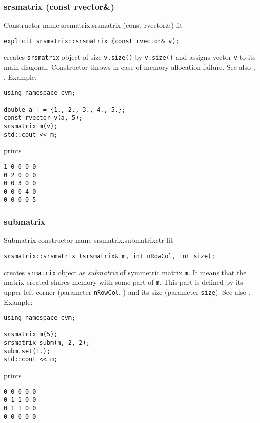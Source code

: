 \subsubsection{srsmatrix (const rvector\&)}
Constructor%
\pdfdest name {srsmatrix.srsmatrix (const rvector&)} fit
\begin{verbatim}
explicit srsmatrix::srsmatrix (const rvector& v);
\end{verbatim}
creates  \verb"srsmatrix" object
of size \verb"v.size()" by \verb"v.size()"
and assigns vector \verb"v" to its main diagonal.
Constructor throws  
in case of memory allocation failure.
See also , .
Example:
\begin{Verbatim}
using namespace cvm;

double a[] = {1., 2., 3., 4., 5.};
const rvector v(a, 5);
srsmatrix m(v);
std::cout << m;
\end{Verbatim}
prints
\begin{Verbatim}
1 0 0 0 0
0 2 0 0 0
0 0 3 0 0
0 0 0 4 0
0 0 0 0 5
\end{Verbatim}
\newpage


\subsubsection{submatrix}
Submatrix constructor%
\pdfdest name {srsmatrix.submatrixctr} fit
\begin{verbatim}
srsmatrix::srsmatrix (srsmatrix& m, int nRowCol, int size);
\end{verbatim}
creates  \verb"srmatrix" object as  \emph{submatrix} of 
symmetric matrix \verb"m".
It means that the matrix created shares memory with some part
of \verb"m". This part is defined by its upper left corner (parameter
\verb"nRowCol", \Based)
and its size (parameter \verb"size").
See also .
Example:
\begin{Verbatim}
using namespace cvm;

srsmatrix m(5);
srsmatrix subm(m, 2, 2);
subm.set(1.);
std::cout << m;
\end{Verbatim}
prints
\begin{Verbatim}
0 0 0 0 0
0 1 1 0 0
0 1 1 0 0
0 0 0 0 0
\end{Verbatim}
\newpage



